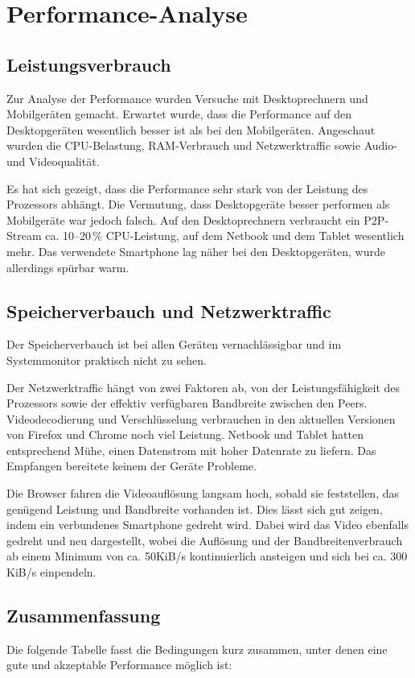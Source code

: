 \chapter{Performance-Analyse}
	\section{Leistungsverbrauch}
		Zur Analyse der Performance wurden Versuche mit Desktoprechnern und Mobilgeräten gemacht. Erwartet wurde, dass die Performance auf den Desktopgeräten wesentlich besser ist als bei den Mobilgeräten.
		Angeschaut wurden die CPU-Belastung, RAM-Verbrauch und Netzwerktraffic sowie
		Audio- und Videoqualität.
		
		Es hat sich gezeigt, dass die Performance sehr stark von der Leistung des
		Prozessors abhängt. Die Vermutung, dass Desktopgeräte besser performen als Mobilgeräte war jedoch falsch.
		Auf den Desktoprechnern verbraucht ein P2P-Stream ca. 10--20\,\% CPU-Leistung,
		auf dem Netbook und dem Tablet wesentlich mehr. Das verwendete Smartphone lag näher bei den Desktopgeräten, wurde allerdings spürbar warm.
		
		
	\section{Speicherverbauch und Netzwerktraffic}
		Der Speicherverbauch ist bei allen Geräten vernachlässigbar und im Systemmonitor praktisch nicht zu sehen.
		
		Der Netzwerktraffic hängt von zwei Faktoren ab, von der Leistungsfähigkeit
		des Prozessors sowie der effektiv verfügbaren Bandbreite zwischen den Peers.
		Videodecodierung und Verschlüsselung verbrauchen in den aktuellen Versionen von Firefox und Chrome noch viel Leistung. Netbook und Tablet hatten entsprechend Mühe, einen Datenstrom mit hoher Datenrate zu liefern. Das Empfangen bereitete keinem der Geräte Probleme.
		
		Die Browser fahren die Videoauflösung langsam hoch, sobald sie feststellen, das genügend Leistung und Bandbreite vorhanden ist. Dies lässt sich gut zeigen, indem ein verbundenes Smartphone gedreht wird. Dabei wird das Video ebenfalls gedreht und neu dargestellt, wobei die Auflösung und der Bandbreitenverbrauch ab einem Minimum von ca. 50KiB/s kontinuierlich ansteigen und sich bei ca. 300 KiB/s einpendeln.
	
	
	\section{Zusammenfassung}
		Die folgende Tabelle fasst die Bedingungen kurz zusammen, unter denen eine
		gute und akzeptable Performance möglich ist:

